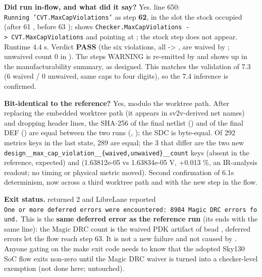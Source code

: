 \begin{record}
{}

\textbf{Did  run in-flow, and what did it
say?} Yes.  line 650:
\texttt{Running\ 'CVT.\allowbreak{}MaxCapViolations'} as step
\textbf{62}, in the slot the stock 
occupied (after 61 , before 63
);  shows
\texttt{Checker.\allowbreak{}MaxCapViolations\ -\allowbreak{}>\ CVT.\allowbreak{}MaxCapViolations}
and  pointing at
; the stock step does not appear.
Runtime 4.4 s. Verdict \textbf{PASS} (the six violations, all
 -\textgreater{} , are
waived by ; unwaived count 0 in
). The
step\textquotesingle s WARNING is re-emitted by  and shows
up in the manufacturability summary, as designed. This matches the
 validation of 7.3 (6 waived / 0 unwaived, same caps to
four digits), so the 7.4 inference is confirmed.

\textbf{Bit-identical to the reference?} Yes, modulo the worktree path.
After replacing the embedded  worktree path (it
appears in sv2v-derived net names) and dropping \code{//} header lines,
the SHA-256 of the final netlist
() and of the final DEF
() are equal between the
two runs (, ); the SDC is
byte-equal. Of 292 metrics keys in the last state, 289 are equal; the 3
that differ are the two new
\texttt{design\_\allowbreak{}\_\allowbreak{}max\_\allowbreak{}cap\_\allowbreak{}violation\_\allowbreak{}\_\allowbreak{}\{waived,\allowbreak{}unwaived\}\_\allowbreak{}\_\allowbreak{}count}
keys (absent in the reference, expected) and
(1.63812e-05 vs 1.63834e-05 V, +0.013 \%, an IR-analysis readout; no
timing or physical metric moved). Second confirmation of
6.1\textquotesingle s determinism, now across a third worktree path and
with the new step in the flow.

\textbf{Exit status.}  returned 2 and LibreLane reported
\texttt{One\ or\ more\ deferred\ errors\ were\ encountered:\allowbreak{}\ 8984\ Magic\ DRC\ errors\ found.\allowbreak{}}
This is the \textbf{same deferred error as the reference run} (its
 ends with the same line): the Magic DRC count is the
waived PDK artifact of bead , deferred errors let the flow
reach step 63. It is not a new failure and not caused by
. Anyone gating on the make exit code needs
to know that the adopted Sky130 SoC flow exits non-zero until the Magic
DRC waiver is turned into a checker-level exemption (not done here;
untouched).


\end{record}
